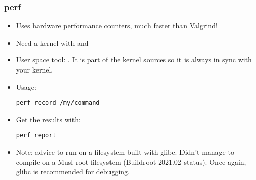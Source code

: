 \begin{frame}[fragile]
\frametitle{perf}
\begin{itemize}
        \item Uses hardware performance counters, much faster than Valgrind!
        \item Need a kernel with  and 
        \item User space tool: . It is part of the kernel
                sources so it is always in sync with your kernel.
        \item Usage:
        \begin{block}{}
\begin{verbatim}
perf record /my/command
\end{verbatim}
        \end{block}
        \item Get the results with:
        \begin{block}{}
\begin{verbatim}
perf report
\end{verbatim}
        \end{block}
        \item Note: advice to run  on a filesystem built with
              glibc. Didn't manage to compile  on a Musl
              root filesystem (Buildroot 2021.02 status). Once again, glibc is
              recommended for debugging.
\end{itemize}
\end{frame}

